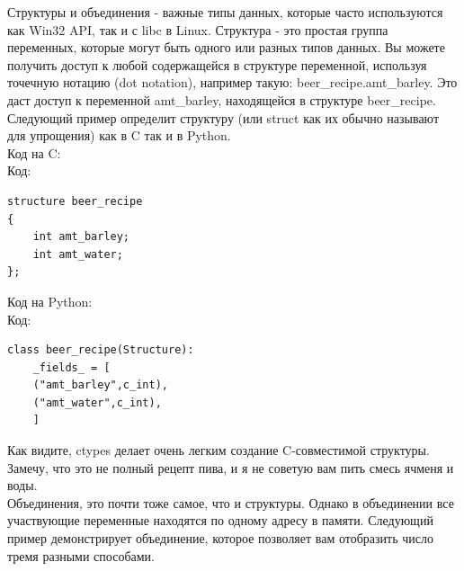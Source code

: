 \documentclass[12pt, a4paper, oneside]{book}
\begin{document}
Структуры и объединения - важные типы данных, которые часто используются как Win32 API, так и с libc в Linux. Структура - это простая группа переменных, которые могут быть одного или разных типов данных. Вы можете получить доступ к любой содержащейся в структуре переменной, используя точечную нотацию (dot notation), например такую: beer\_recipe.amt\_barley. Это даст доступ к переменной amt\_barley, находящейся в структуре beer\_recipe. Следующий пример определит структуру (или struct как их обычно называют для упрощения) как в C так и в Python.\\
Код на C:\\
Код:
\begin{verbatim}
structure beer_recipe
{
    int amt_barley;
    int amt_water;
};
\end{verbatim}
Код на Python:\\
Код:
\begin{verbatim}
class beer_recipe(Structure):
    _fields_ = [
    ("amt_barley",c_int),
    ("amt_water",c_int),
    ]
\end{verbatim}
Как видите, ctypes делает очень легким создание C-совместимой структуры. Замечу, что это не полный рецепт пива, и я не советую вам пить смесь ячменя и воды.\\

Объединения, это почти тоже самое, что и структуры. Однако в объединении все участвующие переменные находятся по одному адресу в памяти. Следующий пример демонстрирует объединение, которое позволяет вам отобразить число тремя разными способами.\\
\end{document}
